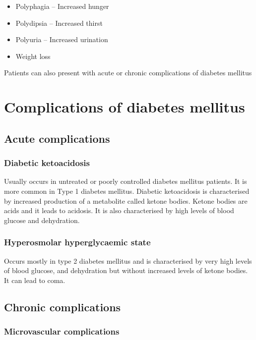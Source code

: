 \documentclass[
]{book}
\providecommand{\tightlist}{%
  \setlength{\itemsep}{0pt}\setlength{\parskip}{0pt}}
\begin{document}
\begin{itemize}
\tightlist
\item
  Polyphagia -- Increased hunger
\item
  Polydipsia -- Increased thirst
\item
  Polyuria -- Increased urination
\item
  Weight loss
\end{itemize}

Patients can also present with acute or chronic complications of diabetes mellitus

\section{Complications of diabetes mellitus}\label{complications-of-diabetes-mellitus}

\subsection{Acute complications}\label{acute-complications}

\subsubsection{Diabetic ketoacidosis}\label{diabetic-ketoacidosis}

Usually occurs in untreated or poorly controlled diabetes mellitus patients. It is more common in Type 1 diabetes mellitus. Diabetic ketoacidosis is characterised by increased production of a metabolite called ketone bodies. Ketone bodies are acids and it leads to acidosis.
It is also characterised by high levels of blood glucose and dehydration.

\subsubsection{Hyperosmolar hyperglycaemic state}\label{hyperosmolar-hyperglycaemic-state}

Occurs mostly in type 2 diabetes mellitus and is characterised by
very high levels of blood glucose, and dehydration but without increased levels of ketone bodies. It can lead to coma.

\subsection{Chronic complications}\label{chronic-complications}

\subsubsection{Microvascular complications}\label{microvascular-complications}
\end{document}

